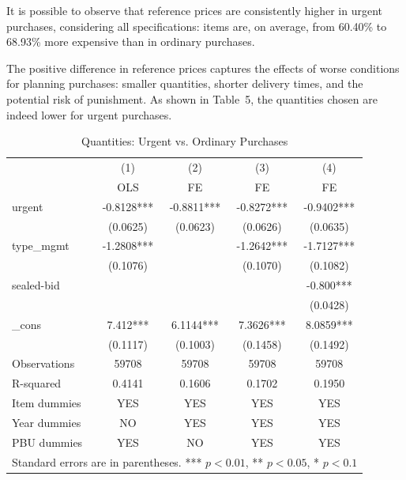 It is possible to observe that reference prices are consistently higher in urgent purchases, considering all specifications: items are, on average, from 60.40\% to 68.93\% more expensive than in ordinary purchases.

The positive difference in reference prices captures the effects of worse conditions for planning purchases: smaller quantities, shorter delivery times, and the potential risk of punishment. As shown in Table~5, the quantities chosen are indeed lower for urgent purchases.

\begin{table}[ht]
  \centering
  \caption{Quantities: Urgent vs. Ordinary Purchases}
  \begin{tabular}{lcccc}
    \hline
           & (1)        & (2)        & (3)        & (4)        \\
           & OLS       & FE         & FE         & FE         \\
    \hline
    urgent     & -0.8128*** & -0.8811*** & -0.8272*** & -0.9402*** \\
               & (0.0625)   & (0.0623)   & (0.0626)   & (0.0635)   \\
    type\_mgmt & -1.2808*** &           & -1.2642*** & -1.7127*** \\
               & (0.1076)   &           & (0.1070)   & (0.1082)   \\
    sealed-bid &            &           &           & -0.800***  \\
               &            &           &           & (0.0428)   \\
    \_cons     & 7.412***   & 6.1144*** & 7.3626*** & 8.0859***  \\
               & (0.1117)   & (0.1003)   & (0.1458)   & (0.1492)   \\
    Observations & 59708    & 59708     & 59708     & 59708     \\
    R-squared  & 0.4141     & 0.1606    & 0.1702    & 0.1950    \\
    Item dummies & YES      & YES       & YES       & YES       \\
    Year dummies & NO       & YES       & YES       & YES       \\
    PBU dummies & YES       & NO        & YES       & YES       \\
    \hline
    \multicolumn{5}{l}{\footnotesize Standard errors are in parentheses. *** $p<0.01$, ** $p<0.05$, * $p<0.1$}
  \end{tabular}
\end{table}

